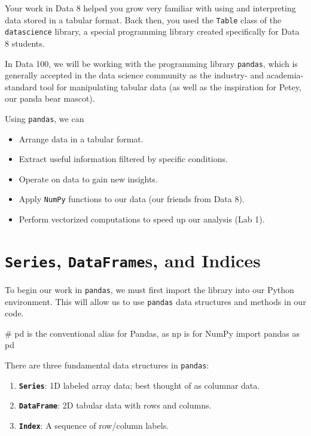 \documentclass[
  letterpaper,
  DIV=11,
  numbers=noendperiod]{scrreprt}
\newenvironment{Shaded}{\begin{snugshade}}{\end{snugshade}}
\newcommand{\CommentTok}[1]{\textcolor[rgb]{0.37,0.37,0.37}{#1}}
\newcommand{\ImportTok}[1]{\textcolor[rgb]{0.00,0.46,0.62}{#1}}
\newcommand{\NormalTok}[1]{\textcolor[rgb]{0.00,0.23,0.31}{#1}}
\providecommand{\tightlist}{%
  \setlength{\itemsep}{0pt}\setlength{\parskip}{0pt}}\usepackage{longtable,booktabs,array}
\begin{document}
Your work in Data 8 helped you grow very familiar with using and
interpreting data stored in a tabular format. Back then, you used the
\texttt{Table} class of the \texttt{datascience} library, a special
programming library created specifically for Data 8 students.

In Data 100, we will be working with the programming library
\texttt{pandas}, which is generally accepted in the data science
community as the industry- and academia-standard tool for manipulating
tabular data (as well as the inspiration for Petey, our panda bear
mascot).

Using \texttt{pandas}, we can

\begin{itemize}
\tightlist
\item
  Arrange data in a tabular format.
\item
  Extract useful information filtered by specific conditions.
\item
  Operate on data to gain new insights.
\item
  Apply \texttt{NumPy} functions to our data (our friends from Data 8).
\item
  Perform vectorized computations to speed up our analysis (Lab 1).
\end{itemize}

\hypertarget{series-dataframes-and-indices}{%
\section{\texorpdfstring{\texttt{Series}, \texttt{DataFrame}s, and
Indices}{Series, DataFrames, and Indices}}\label{series-dataframes-and-indices}}

To begin our work in \texttt{pandas}, we must first import the library
into our Python environment. This will allow us to use \texttt{pandas}
data structures and methods in our code.

\begin{Shaded}
\begin{Highlighting}[]
\CommentTok{\# \textasciigrave{}pd\textasciigrave{} is the conventional alias for Pandas, as \textasciigrave{}np\textasciigrave{} is for NumPy}
\ImportTok{import}\NormalTok{ pandas }\ImportTok{as}\NormalTok{ pd}
\end{Highlighting}
\end{Shaded}

There are three fundamental data structures in \texttt{pandas}:

\begin{enumerate}
\def\labelenumi{\arabic{enumi}.}
\tightlist
\item
  \textbf{\texttt{Series}}: 1D labeled array data; best thought of as
  columnar data.
\item
  \textbf{\texttt{DataFrame}}: 2D tabular data with rows and columns.
\item
  \textbf{\texttt{Index}}: A sequence of row/column labels.
\end{enumerate}
\end{document}
